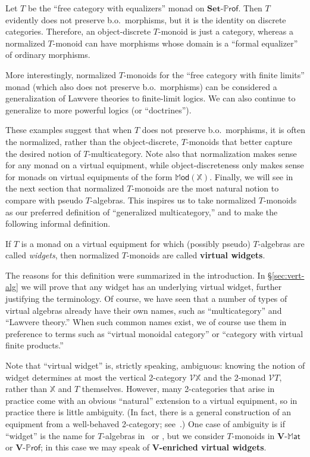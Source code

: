 \documentclass{tac}
\newcommand{\V}{\ensuremath{\mathbf{V}}}
\newcommand{\calV}{\ensuremath{\mathcal{V}}}
\newcommand{\MAT}[1]{\mathbf{#1}\mbox{-}\mathbb{M}\mathsf{at}}
\newcommand{\PROF}[1]{\mathbf{#1}\mbox{-}\mathbb{P}\mathsf{rof}}
\newcommand{\Mod}{\ensuremath{\mathbb{M}\mathsf{od}}}
\numberwithin{equation}{section}
\begin{document}
\begin{example}
  Let $T$ be the ``free category with equalizers'' monad on $\PROF{Set}$.
  Then $T$ evidently does not preserve b.o.\ morphisms, but it is the
  identity on discrete categories.  Therefore, an object-discrete
  $T$-monoid is just a category, whereas a normalized $T$-monoid can
  have morphisms whose domain is a ``formal equalizer'' of ordinary
  morphisms.

  More interestingly, normalized $T$-monoids for the ``free category
  with finite limits'' monad (which also does not preserve b.o.\
  morphisms) can be considered a generalization of Lawvere theories to
  finite-limit logics.  We can also continue to generalize to more
  powerful logics (or ``doctrines'').
\end{example}

These examples suggest that when $T$ does not
preserve b.o.\ morphisms, it is often the normalized, rather than the
object-discrete, $T$-monoids that better capture the desired notion of
$T$-multicategory.  Note also that normalization makes sense for any
monad on a virtual equipment, while object-discreteness only makes
sense for monads on virtual equipments of the form $\Mod(\mathbb{X})$.
Finally, we will see in the next section that normalized $T$-monoids
are the most natural notion to compare with pseudo $T$-algebras.
This inspires us to take normalized $T$-monoids as our preferred
definition of ``generalized multicategory,'' and to make the following
informal definition.

\begin{definition}
  If $T$ is a monad on a virtual equipment for which (possibly pseudo)
  $T$-algebras are called \emph{widgets}, then normalized $T$-monoids
  are called \textbf{virtual widgets}.
\end{definition}

The reasons for this definition were summarized in the introduction.  In
\S\ref{sec:vert-alg} we will prove that any widget has an underlying
virtual widget, further justifying the terminology.  Of course, we have
seen that a number of types of virtual algebras already have their own
names, such as ``multicategory'' and ``Lawvere theory.''  When such
common names exist, we of course use them in preference to terms such as
``virtual monoidal category'' or ``category with virtual finite
products.''


Note that ``virtual widget'' is, strictly speaking, ambiguous: knowing
the notion of widget determines at most the vertical 2-category
$\calV\mathbb{X}$ and the 2-monad $\calV T$, rather than $\mathbb{X}$
and $T$ themselves.  However, many 2-categories that arise in practice
come with an obvious ``natural'' extension to a virtual equipment, so in
practice there is little ambiguity.  (In fact, there is a general
construction of an equipment from a well-behaved 2-category;
see~\cite{cjsv:modulated-bicats}.)  One case of ambiguity is if
``widget'' is the name for $T$-algebras in \Set\ or \Cat, but we
consider $T$-monoids in $\MAT{V}$ or $\PROF{V}$; in this case we may
speak of \textbf{\V-enriched virtual widgets}.
\end{document}
